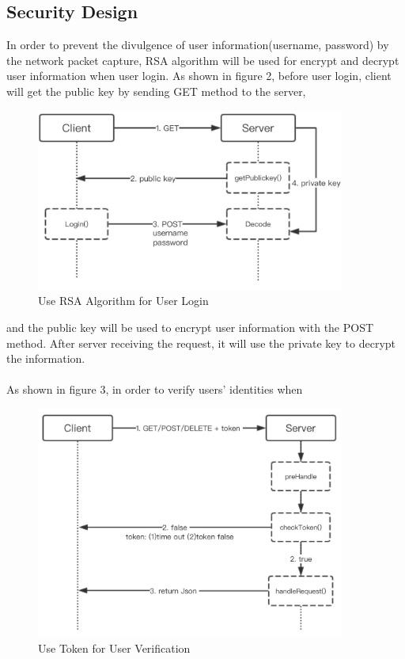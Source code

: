 \documentclass[12pt,a4]{article}
\begin{document}
\subsection{Security Design}\label{3.3}
In order to prevent the divulgence of user information(username, password) by the network packet capture, RSA algorithm will be used for encrypt and decrypt user information when user login. As shown in figure 2, before user login, client will get the public key by sending GET method to the server, 
\begin{figure}[h]%
		\centering  %
		\includegraphics[width=4in]{figure/2}  	%
		\caption{Use RSA Algorithm for User Login }   %
		\end{figure}
and the public key will be used to encrypt user information with the POST method. After server receiving the request, it will use the private key to decrypt the information.
\\
\\
As shown in figure 3, in order to verify users’ identities when 
\begin{figure}[h]%
		\centering  %
		\includegraphics[width=4in]{figure/3}  	%
		\caption{Use Token for User Verification}   %
		\end{figure}
\end{document}
